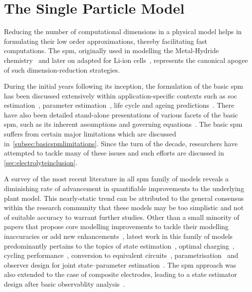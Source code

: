 \section{The Single Particle Model}



Reducing  the   number  of   computational  dimensions   in  a   physical  model
helps  in  formulating  their  low order  approximations,  thereby  facilitating
fast   computations.   The  \gls{spm},   originally   used   in  modelling   the
Metal-Hydride    chemistry~\cite{Haran1998}   and    later   on    adapted   for
Li-ion   cells~\cite{Ning2004},  represents   the  canonical   apogee  of   such
dimension-reduction strategies.


During the initial  years following its inception, the formulation  of the basic
\gls{spm} has  been discussed  extensively within  application-specific contexts
such  as  \gls{soc}  estimation~\cite{Santhanagopalan2006a,Santhanagopalan2008},
parameter   estimation~\cite{Santhanagopalan2007},   life   cycle   and   ageing
predictions~\cite{Santhanagopalan2008a,Safari2009}.   There   have   also   been
detailed    stand-alone    presentations    of    various    facets    of    the
basic   \gls{spm},   such   as    its   inherent   assumptions   and   governing
equations~\cite{Santhanagopalan2006,Chaturvedi2010}.    The   basic    \gls{spm}
suffers    from    certain    major     limitations    which    are    discussed
in~\cref{subsec:basicspmlimitations}. Since the turn  of the decade, researchers
have attempted to tackle many of these  issues and such efforts are discussed in
\cref{sec:electrolyteinclusion}.


A  survey of  the  most recent  literature  in all  \gls{spm}  family of  models
reveals a  diminishing rate of  advancement in quantifiable improvements  to the
underlying  plant model.  This  nearly-static  trend can  be  attributed to  the
general consensus  within the research  community that  these models may  be too
simplistic and not  of suitable accuracy to warrant further  studies. Other than
a  small  minority  of  papers  that  propose  core  modelling  improvements  to
tackle  their modelling  inaccuracies  or  add new  enhancements~\cite{Li2017a},
latest  work in  this  family of  models predominantly  pertains  to the  topics
of    state   estimation~\cite{Chaochun2018,Lin2017,Tran2017,Moura2017,Zou2016},
optimal    charging~\cite{Perez2015},    cycling    performance~\cite{Maia2017},
conversion           to            equivalent           circuits~\cite{Li2017b},
parametrisation~\cite{Li2018,Rajabloo2017,Bizeray2017}  and observer  design for
joint  state--parameter estimation~\cite{Ascencio2016}.  The \gls{spm}  approach
was  also extended  to the  case  of composite  electrodes, leading  to a  state
estimator design after basic observablity analysis~\cite{Bartlett2015b}.


